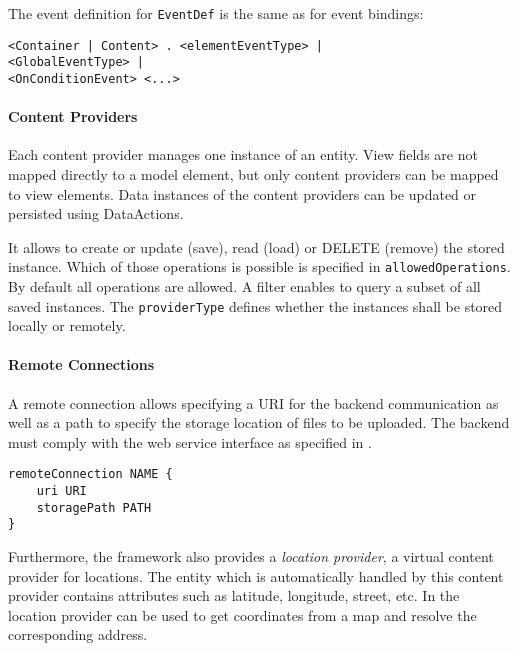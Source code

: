 The event definition for \lstinline!EventDef! is the same as for event bindings:
\begin{lstlisting}
<Container | Content> . <elementEventType> |
<GlobalEventType> |
<OnConditionEvent> <...>
\end{lstlisting}

\paragraph{Content Providers}
Each content provider manages one instance of an entity. View fields are not mapped directly to a model element, but only content providers can be mapped to view elements. Data instances of the content providers can be updated or persisted using DataActions.

It allows to create or update (save), read (load) or DELETE (remove) the stored instance. Which of those operations is possible is specified in \lstinline!allowedOperations!. By default all operations are allowed. A filter enables to query a subset of all saved instances. The \lstinline!providerType! defines whether the instances shall be stored locally or remotely.

\paragraph{Remote Connections} 
A remote connection allows specifying a URI for the backend communication as well as a path to specify the storage location of files to be uploaded. The backend must comply with the \MD web service interface as specified in .
\begin{lstlisting}
remoteConnection NAME {
	uri URI
	storagePath PATH
}
\end{lstlisting}

Furthermore, the \MD framework also provides a \textit{location provider}, \ie a virtual content provider for locations. The entity which is automatically handled by this content provider contains attributes such as latitude, longitude, street, etc. In \mapapps the location provider can be used to get coordinates from a map and resolve the corresponding address.
